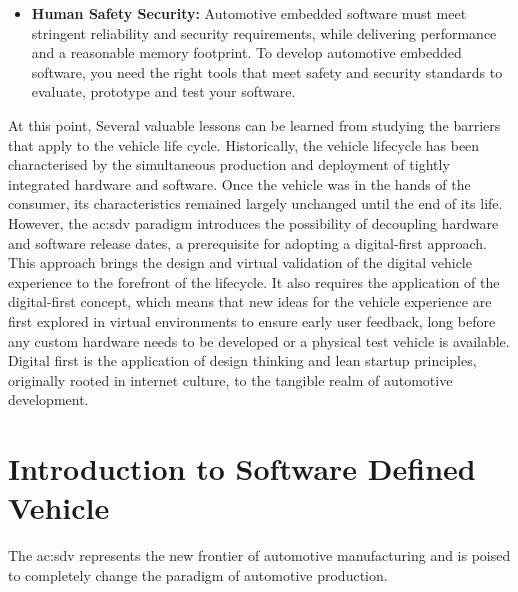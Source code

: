\begin{itemize}
    \item \textbf{Human Safety Security:} Automotive embedded software must meet stringent reliability and security requirements, while delivering performance and a reasonable memory footprint. To develop automotive embedded software, you need the right tools that meet safety and security standards to evaluate, prototype and test your software.
\end{itemize}

At this point, Several valuable lessons can be learned from studying the barriers that apply to the vehicle life cycle. Historically, the vehicle lifecycle has been characterised by the simultaneous production and deployment of tightly integrated hardware and software. Once the vehicle was in the hands of the consumer, its characteristics remained largely unchanged until the end of its life. However, the \gls{ac:sdv} paradigm introduces the possibility of decoupling hardware and software release dates, a prerequisite for adopting a digital-first approach. This approach brings the design and virtual validation of the digital vehicle experience to the forefront of the lifecycle.
It also requires the application of the digital-first concept, which means that new ideas for the vehicle experience are first explored in virtual environments to ensure early user feedback, long before any custom hardware needs to be developed or a physical test vehicle is available. Digital first is the application of design thinking and lean startup principles, originally rooted in internet culture, to the tangible realm of automotive development.


\section{Introduction to Software Defined Vehicle}
The \gls{ac:sdv} represents the new frontier of automotive manufacturing and is poised to completely change the paradigm of automotive production. 

